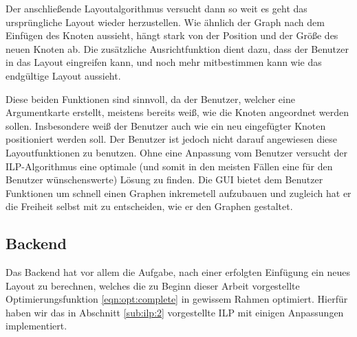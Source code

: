 Der anschließende Layoutalgorithmus versucht dann so weit es geht das ursprüngliche
Layout wieder herzustellen. Wie ähnlich der Graph nach dem Einfügen des Knoten aussieht,
hängt stark von der Position und der Größe des neuen Knoten ab. Die zusätzliche
Ausrichtfunktion dient dazu, dass der Benutzer in das Layout eingreifen kann, und noch mehr
mitbestimmen kann wie das endgültige Layout aussieht.

Diese beiden Funktionen sind sinnvoll, da der Benutzer, welcher eine Argumentkarte erstellt,
meistens bereits weiß, wie die Knoten angeordnet werden sollen. Insbesondere weiß der
Benutzer auch wie ein neu eingefügter Knoten positioniert werden soll. Der Benutzer ist
jedoch nicht darauf angewiesen diese Layoutfunktionen zu benutzen. Ohne eine Anpassung
vom Benutzer versucht der ILP-Algorithmus eine optimale (und somit in den meisten Fällen
eine für den Benutzer wünschenswerte) Lösung zu finden.
 Die GUI bietet dem Benutzer Funktionen um schnell einen Graphen inkremetell aufzubauen
und zugleich hat er die Freiheit selbst mit zu entscheiden, wie er den Graphen gestaltet.



\subsection{Backend}

Das Backend hat vor allem die Aufgabe, nach einer erfolgten Einfügung ein neues Layout zu berechnen, welches die zu Beginn dieser Arbeit vorgestellte Optimierungsfunktion \ref{eqn:opt:complete} in gewissem Rahmen optimiert. Hierfür haben wir das in Abschnitt \ref{sub:ilp:2} vorgestellte ILP mit einigen Anpassungen implementiert.
